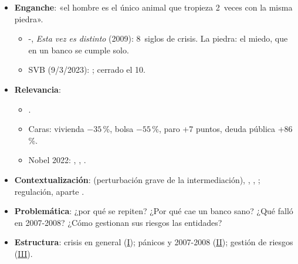 \documentclass{article}
\begin{document}
\cabecerarepaso
\begin{columnas}

\begin{itemize}
\item \textbf{Enganche}: «el hombre es el único animal que tropieza 2~veces con la misma piedra».
  \begin{itemize}
  \item {}-, \emph{Esta vez es distinto} (2009): 8~siglos de crisis. La piedra: el miedo, que en un banco se cumple solo.
  \item SVB (9/3/2023): ; cerrado el 10.
  \end{itemize}
\item \textbf{Relevancia}:
  \begin{itemize}
  \item {}.
  \item Caras: vivienda $-35$\,\%, bolsa $-55$\,\%, paro +7 puntos, deuda pública +86\,\%.
  \item Nobel 2022: , , .
  \end{itemize}
\item \textbf{Contextualización}:  (perturbación grave de la intermediación), , , ; regulación, aparte .
\item \textbf{Problemática}: ¿por qué se repiten? ¿Por qué cae un banco sano? ¿Qué falló en 2007-2008? ¿Cómo gestionan sus riesgos las entidades?
\item \textbf{Estructura}: crisis en general (\hyperref[rep:I]{I}); pánicos y 2007-2008 (\hyperref[rep:II]{II}); gestión de riesgos (\hyperref[rep:III]{III}).
\end{itemize}


\end{columnas}
\end{document}
